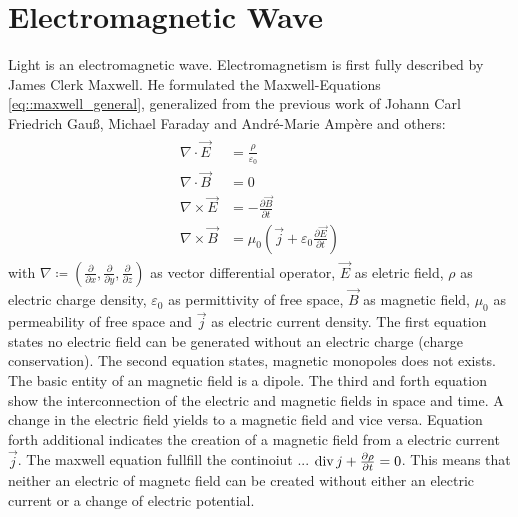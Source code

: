 \section{Electromagnetic Wave}
% 
Light is an electromagnetic wave. Electromagnetism is first fully described by James Clerk Maxwell. He formulated the Maxwell-Equations \cref{eq::maxwell_general}, generalized from the previous work of Johann Carl Friedrich Gau{\ss}, Michael Faraday and Andr\'{e}-Marie Amp\`{e}re and others:
% 
% 
\begin{align} 
\begin{split} \label{eq::maxwell_general}
    \nabla \cdot \vec{E} &= \frac {\rho} {\varepsilon_0}\\
    \nabla \cdot \vec{B} &= 0\\
    \nabla \times \vec{E} &= -\frac{\partial \vec{B}} {\partial t}\\
    \nabla \times \vec{B} &= \mu_0\left(\vec{j} + \varepsilon_0 \frac{\partial \vec{E}} {\partial t} \right)
\end{split}
\end{align}
% 
with $\nabla \coloneqq \left({\frac{\partial}{\partial x}}, {\frac{\partial}{\partial y}}, {\frac{\partial}{\partial z}} \right)$ as vector differential operator, $\vec{E}$ as eletric field, $\rho$ as electric charge density, $\varepsilon_0$ as permittivity of free space, $\vec{B}$ as magnetic field, $\mu_0$ as permeability of free space and $\vec{j}$ as electric current density.
% 
The first equation states no electric field can be generated without an electric charge (charge conservation).
The second equation states, magnetic monopoles does not exists. The basic entity of an magnetic field is a dipole.
The third and forth equation show the interconnection of the electric and magnetic fields in space and time.
A change in the electric field yields to a magnetic field and vice versa.
Equation forth additional indicates the creation of a magnetic field from a electric current $\vec{j}$.
The maxwell equation fullfill the continoiut ... $\operatorname{div} j + \frac{\partial \rho}{\partial t} = 0$.
This means that neither an electric of magnetc field can be created without either an electric current or a change of electric potential.
%
% 
